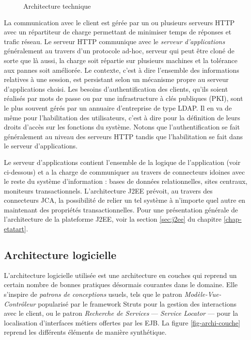 \begin{figure}[htbp]
    \centering
    \caption{Architecture technique}
    \label{fig-infra-technique}
\end{figure}

La communication avec le client est g\'er\'ee par un ou plusieurs
serveurs HTTP avec un r\'epartiteur de charge permettant de minimiser
temps de r\'eponses et trafic r\'eseau. Le serveur \textsf{HTTP}
communique avec le \emph{serveur d'applications} g\'en\'eralement au
travers d'un protocole ad-hoc, serveur qui peut \^etre clon\'e de
sorte que l\`a aussi, la charge soit r\'epartie sur plusieurs
machines et la tol\'erance aux pannes soit am\'elior\'ee.  Le
contexte, c'est \`a dire l'ensemble des informations relatives \`a
une session, est persistant selon un m\'ecanisme
propre au serveur
d'applications choisi. Les besoins d'authentification des clients,
qu'ils soient r\'ealis\'es par mots de passe ou par une
infrastructure \`a cl\'es publiques (\textsf{PKI}), sont
le plus souvent g\'er\'es par un annuaire d'entreprise de type
\textsf{LDAP}. Il en va de m\^eme pour l'habilitation des
utilisateurs, c'est \`a dire pour la d\'efinition de leurs droits
d'acc\`es sur les fonctions du syst\`eme. Notons que
l'authentification se fait g\'en\'eralement au niveau des serveurs
HTTP tandis que l'habilitation se fait dans le serveur d'applications. 

Le serveur d'applications contient l'ensemble de la logique  de
l'application (voir ci-dessous) et a la charge de communiquer au
travers de connecteurs idoines avec le reste du syst\`eme
d'information : bases de donn\'ees relationnelles, sites centraux,
moniteurs transactionnels. L'architecture \textsf{J2EE} pr\'evoit, au travers
des connecteurs \textsf{JCA}, la possibilit\'e de relier un tel
syst\`eme \`a n'importe quel autre  en maintenant des
propri\'et\'es transactionnelles. Pour une pr\'esentation
g\'en\'erale de l'architecture de la plateforme \textsf{J2EE}, voir
la section \ref{sec:j2ee} du chapitre \ref{chap-etatart}.

\subsection{Architecture logicielle}
\label{sec:arch-logic}
L'architecture logicielle utilis\'ee est une architecture en couches 
qui reprend un certain nombre de \og bonnes pratiques\fg{} d\'esormais
courantes dans le domaine. Elle s'inspire  de
\emph{patrons de conceptions}\cite{core-j2ee-patterns,gof} usuels, tels que le patron
\emph{Mod\`ele-Vue-Contr\^oleur} popularis\'e par le framework
\textsf{Struts} pour la gestion des interactions avec le client, ou
le patron \emph{Recherche de Services}  --- 
\emph{Service Locator} --- pour la localisation d'interfaces
m\'etiers offertes par les \textsf{EJB}. La figure
\ref{fig-archi-couche} reprend les diff\'erents \'el\'ements de
mani\`ere synth\'etique. 

